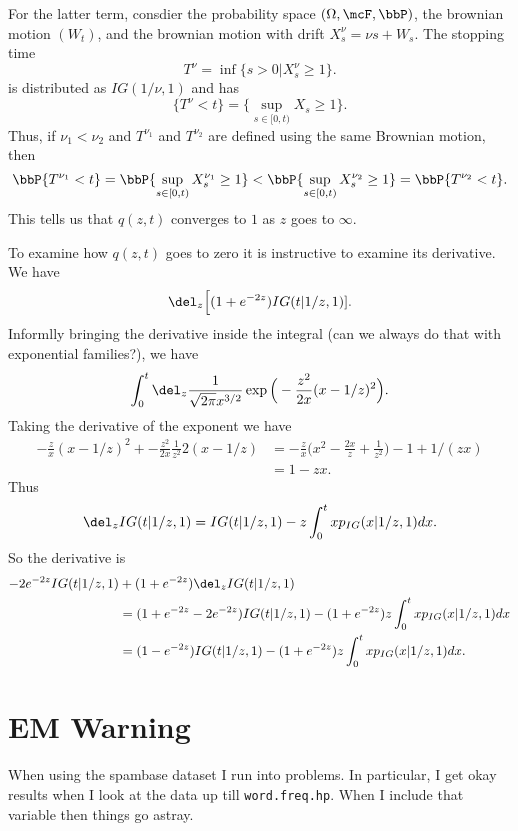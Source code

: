 \documentclass[]{article}
\begin{document}
For the latter term, consdier the probability space $(\Omega, \mcF, \bbP)$, the
brownian motion $(W_t)$, and the brownian motion with drift $X_s^{\nu} = \nu s +
W_s$.  The stopping time
\[
T^{\nu} = \inf \{ s > 0 | X_s^{\nu} \geq 1 \}.
\]
is distributed as $IG(1/\nu, 1)$ and has
\[
\{ T^{\nu} < t \} = \{ \sup_{s \in [0,t)} X_s \geq 1 \}.
\]
Thus, if $\nu_1 < \nu_2$ and $T^{\nu_1}$ and $T^{\nu_2}$ are defined using the
same Brownian motion, then
\[
\bbP \{ T^{\nu_1} < t \} = \bbP \{ \sup_{s \in [0,t)} X_s^{\nu_1} \geq 1 \} <
\bbP \{ \sup_{s \in [0,t)} X_s^{\nu_2} \geq 1 \} = \bbP \{ T^{\nu_2} < t \}.
\]
This tells us that $q(z,t)$ converges to $1$ as $z$ goes to $\infty$.

To examine how $q(z,t)$ goes to zero it is instructive to examine its
derivative.  We have
\[
\del_z \Big[ (1+e^{-2z}) IG(t | 1/z, 1) ].
\]
Informlly bringing the derivative inside the integral (can we always do that
with exponential families?), we have
\[
\int_0^t \del_z \frac{1}{\sqrt{2 \pi} x^{3/2}} \exp \Big( - \frac{z^2}{2
  x}(x-1/z)^2 \Big).
\]
Taking the derivative of the exponent we have
\begin{align*}
-\frac{z}{x} (x-1/z)^2 + - \frac{z^2}{2x} \frac{1}{z^2} 2 (x-1/z)
& = -\frac{z}{x}(x^2 - \frac{2x}{z} + \frac{1}{z^2} \Big) - 1 + 1 / (zx) \\
& = 1 - zx.
\end{align*}
Thus 
\[
\del_z IG(t|1/z,1) = IG(t|1/z,1) - z \int_{0}^t x p_{IG}(x|1/z,1) dx.
\]
So the derivative is
\begin{align*}
-2 e^{-2z} IG(t|1/z,1) & + (1+e^{-2z}) \del_z IG(t|1/z,1) \\
& = (1 + e^{-2z} - 2 e^{-2z}) IG(t|1/z,1) - (1 + e^{-2z}) z \int_{0}^t x
p_{IG}(x|1/z,1) dx \\
& = (1 - e^{-2z}) IG(t|1/z,1) - (1 + e^{-2z}) z \int_{0}^t x
p_{IG}(x|1/z,1) dx.
\end{align*}


\section{EM Warning}

When using the spambase dataset I run into problems.  In particular, I get okay
results when I look at the data up till \texttt{word.freq.hp}.  When I include
that variable then things go astray.
\end{document}
